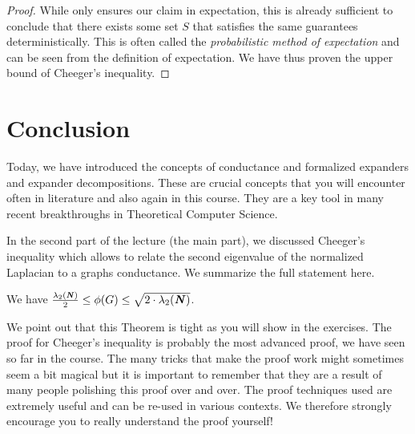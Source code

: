 \begin{proof}
While  only ensures our claim in expectation, this is already sufficient to conclude that there exists some set $S$ that satisfies the same guarantees deterministically. This is often called the \emph{probabilistic method of expectation} and can be seen from the definition of expectation. We have thus proven the upper bound of Cheeger's inequality.
\end{proof}

\section{Conclusion}

Today, we have introduced the concepts of conductance and formalized expanders and expander decompositions. These are crucial concepts that you will encounter often in literature and also again in this course. They are a key tool in many recent breakthroughs in Theoretical Computer Science.

In the second part of the lecture (the main part), we discussed Cheeger's inequality which allows to relate the second eigenvalue of the normalized Laplacian to a graphs conductance. We summarize the full statement here.

\begin{theorem}\label{thm:cheegerInequFull}
We have $\frac{\lambda_2(\boldsymbol{\mathit{N}})}{2} \leq \phi(G) \leq \sqrt{2 \cdot \lambda_2(\boldsymbol{\mathit{N}})}$.
\end{theorem}

We point out that this Theorem is tight as you will show in the exercises. The proof for Cheeger's inequality is probably the most advanced proof, we have seen so far in the course. The many tricks that make the proof work might sometimes seem a bit magical but it is important to remember that they are a result of many people polishing this proof over and over. The proof techniques used are extremely useful and can be re-used in various contexts. We therefore strongly encourage you to really understand the proof yourself!
